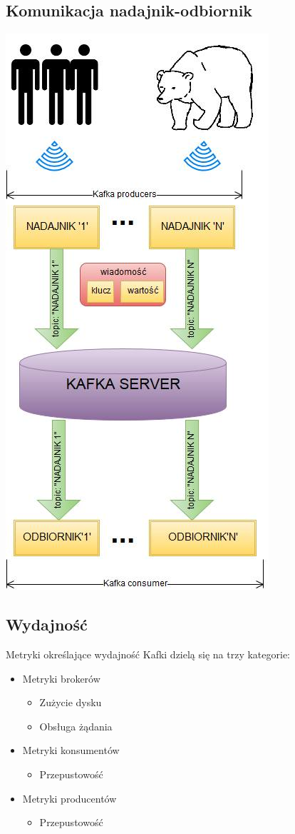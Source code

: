 \documentclass[a4paper,12pt]{article}
\begin{document}
\subsection{Komunikacja nadajnik-odbiornik}
\begin{center}
\includegraphics[scale=0.5]{kafka.png}
\end{center}
\subsection{Wydajność}
Metryki określające wydajność Kafki dzielą się na trzy kategorie:
\begin{itemize}
\item Metryki brokerów
\begin{itemize}
\item Zużycie dysku
\item Obsługa żądania
\end{itemize}
\item Metryki konsumentów
\begin{itemize}
\item Przepustowość
\end{itemize}
\item Metryki producentów
\begin{itemize}
\item Przepustowość
\end{itemize}
\end{itemize}
\end{document}
